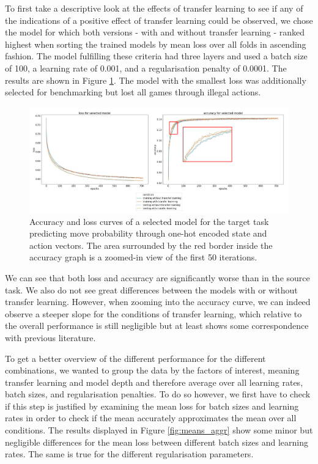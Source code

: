 \documentclass[12pt,a4paper]{article}
\begin{document}
{To first take a descriptive look at the effects of transfer learning to see if any of the indications of a positive effect of transfer learning could be observed, we chose the model for which both versions - with and without transfer learning - ranked highest when sorting the trained models by mean loss over all folds in ascending fashion. The model fulfilling these criteria had three layers and used a batch size of 100, a learning rate of 0.001, and a regularisation penalty of 0.0001. The results are shown in Figure \ref{fig:trnsfr_both}. The model with the smallest loss was additionally selected for benchmarking but lost all games through illegal actions.

\begin{figure}
  \includegraphics[width=15cm]{img/trsnfr_both.jpg}
  \centering 
  \caption{Accuracy and loss curves of a selected model for the target task predicting move probability through one-hot encoded state and action vectors. The area surrounded by the red border inside the accuracy graph is a zoomed-in view of the first 50 iterations.
}
  \label{fig:trnsfr_both}
\end{figure}

We can see that both loss and accuracy are significantly worse than in the source task. We also do not see great differences between the models with or without transfer learning. However, when zooming into the accuracy curve, we can indeed observe a steeper slope for the conditions of transfer learning, which relative to the overall performance is still negligible but at least shows some correspondence with previous literature.

To get a better overview of the different performance for the different combinations, we wanted to group the data by the factors of interest, meaning transfer learning and model depth and therefore average over all learning rates, batch sizes, and regularisation penalties. To do so however, we first have to check if this step is justified by examining the mean loss for batch sizes and learning rates in order to check if the mean accurately approximates the mean over all conditions. The results displayed in Figure \ref{fig:means_aggr} show some minor but negligible differences for the mean loss between different batch sizes and learning rates. The same is true for the different regularisation parameters.

}
\end{document}
